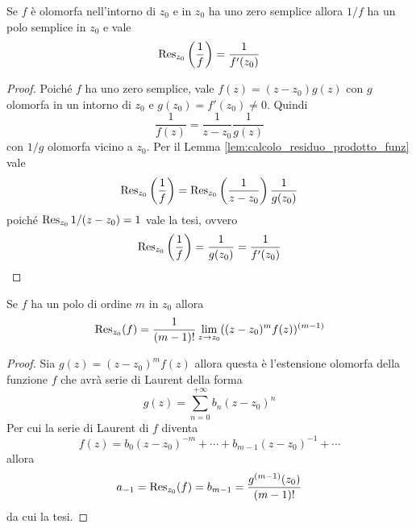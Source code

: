 \begin{lemma}
  Se $f$ è olomorfa nell'intorno di $z_0$ e in $z_0$ ha uno zero semplice allora
  $1/f$ ha un polo semplice in $z_0$ e vale 
  \begin{equation*}
  \operatorname{Res}_{z_0}\left( \frac{1}{f} \right) = \frac{1}{f'(z_0)}
  \end{equation*}
  \label{lem:calcolo_residuo_zero_semplice_inversa}
\end{lemma}
\begin{proof}
  Poiché $f$ ha uno zero semplice, vale $f(z) = (z-z_0) g(z)$ con $g$ olomorfa
  in un intorno di $z_0$ e $g(z_0) = f'(z_0) \neq 0$. Quindi 
  \begin{equation*}
    \frac{1}{f(z)} = \frac{1}{z-z_0} \frac{1}{g(z)}
  \end{equation*}
  con $1/g$ olomorfa vicino a $z_0$. Per il Lemma
  \ref{lem:calcolo_residuo_prodotto_funz} vale
  \begin{equation*}
    \operatorname{Res}_{z_0}\left(\frac{1}{f}\right) = \operatorname{Res}_{z_0}\left(\frac{1}{z-z_0}\right) 
                        \frac{1}{g(z_0)}
  \end{equation*}
  poiché $\operatorname{Res}_{z_0} 1/(z-z_0) = 1$ vale la tesi, ovvero 
  \begin{equation*}
    \operatorname{Res}_{z_0}\left(\frac{1}{f}\right) = \frac{1}{g(z_0)}
    = \frac{1}{f'(z_0)}
  \end{equation*}
\end{proof}

\begin{lemma}
  Se $f$ ha un polo di ordine $m$ in $z_0$ allora 
  \begin{equation*}
    \operatorname{Res}_{z_0}(f) = \frac{1}{(m-1)!} \lim_{z \to z_0} ((z-z_0)^m
  f(z))^{(m-1)}
  \end{equation*}
  \label{lem:calcolo_residuo_polo}
\end{lemma}
\begin{proof}
  Sia $g(z) = (z-z_0)^m f(z)$ allora questa è l'estensione olomorfa della
  funzione $f$ che avrà serie di Laurent della forma
  \begin{equation*}
    g(z) = \sum_{n = 0}^{+\infty} b_n(z-z_0)^n
  \end{equation*}
  Per cui la serie di Laurent di $f$ diventa
  \begin{equation*}
    f(z) = b_0(z-z_0)^{-m} + \cdots + b_{m-1}(z-z_0)^{-1} + \cdots
  \end{equation*}
  allora 
  \begin{equation*}
    a_{-1} = \operatorname{Res}_{z_0}(f) = b_{m-1} = \frac{g^{(m-1)}(z_0)}{(m-1)!}
  \end{equation*}
  da cui la tesi.
\end{proof}

